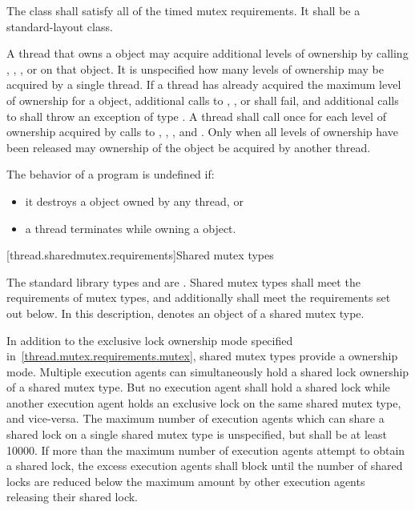 \pnum
The class  shall satisfy all of the timed mutex
requirements. It shall be a standard-layout
class.

\pnum
A thread that owns a  object may acquire additional
levels of ownership by calling , ,
, or  on that object. It is
unspecified how many levels of ownership may be acquired by a single thread. If
a thread has already acquired the maximum level of ownership for a
 object, additional calls to ,
, or  shall fail, and additional
calls to  shall throw an exception of type . A
thread shall call  once for each level of ownership acquired by
calls to , , , and
. Only when all levels of ownership have been released
may ownership of the object be acquired by another thread.

\pnum
The behavior of a program is undefined if:

\begin{itemize}
\item it destroys a  object owned by any thread, or
\item a thread terminates while owning a  object.
\end{itemize}


[thread.sharedmutex.requirements]{Shared mutex types}

\pnum
The standard library types  and 
are . Shared mutex types shall meet the requirements of
mutex types, and additionally
shall meet the requirements set out below. In this description,
 denotes an object of a shared mutex type.

\pnum
In addition to the exclusive lock ownership mode specified
in~\ref{thread.mutex.requirements.mutex}, shared mutex types provide a
 ownership mode. Multiple execution agents can
simultaneously hold a shared lock ownership of a shared mutex type. But no
execution agent shall hold a shared lock while another execution agent holds an
exclusive lock on the same shared mutex type, and vice-versa. The maximum
number of execution agents which can share a shared lock on a single shared
mutex type is unspecified, but shall be at least 10000. If more than the
maximum number of execution agents attempt to obtain a shared lock, the
excess execution agents shall block until the number of shared locks are
reduced below the maximum amount by other execution agents releasing their
shared lock.

